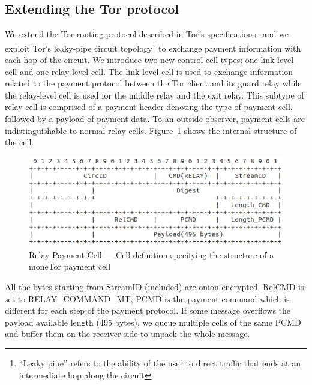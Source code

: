 
\subsection{Extending the Tor protocol}

We extend the Tor routing protocol described in Tor's
specifications~\cite{dingledine2018tor} and we exploit Tor's leaky-pipe circuit
topology\footnote{``Leaky pipe'' refers to the ability of the user to direct
  traffic that ends at an intermediate hop along the circuit} to exchange
payment information with each hop of the circuit. We introduce two new control
cell types: one link-level cell and one relay-level cell. The link-level cell is
used to exchange information related to the payment protocol between the Tor
client and its guard relay while the relay-level cell is used for the middle
relay and the exit relay. This subtype of relay cell is comprised of a payment
header denoting the type of payment cell, followed by a payload of payment
data. To an outside observer, payment cells are indistinguishable to normal
relay cells. Figure~\ref{fig:relay_command_mt_structure} shows the internal structure of the cell.
\begin{figure}[h]
    \centering
    \includegraphics[scale=0.38]{images/payment_cell_header.png}
    \caption{Relay Payment Cell --- Cell definition specifying the structure of
      a moneTor payment cell}
\label{fig:relay_command_mt_structure}
\end{figure}

All the bytes starting from StreamID (included) are onion encrypted. RelCMD is set to RELAY\_COMMAND\_MT, PCMD is the payment command which is different for each step of the payment protocol. If some message overflows the payload available length (495 bytes), we queue multiple cells of the same PCMD and buffer them on the receiver side to unpack the whole message.

